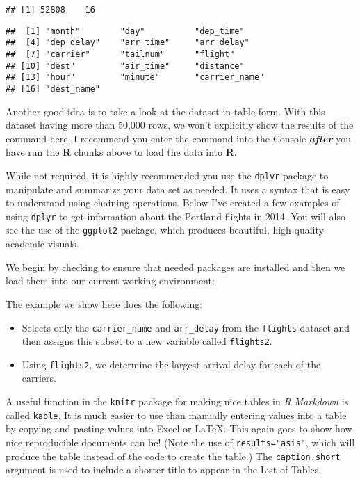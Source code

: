 \documentclass[print]{nuthesis}
\begin{document}
\begin{verbatim}
## [1] 52808    16
\end{verbatim}

\begin{verbatim}
##  [1] "month"        "day"          "dep_time"    
##  [4] "dep_delay"    "arr_time"     "arr_delay"   
##  [7] "carrier"      "tailnum"      "flight"      
## [10] "dest"         "air_time"     "distance"    
## [13] "hour"         "minute"       "carrier_name"
## [16] "dest_name"
\end{verbatim}

Another good idea is to take a look at the dataset in table form. With this dataset having more than 50,000 rows, we won't explicitly show the results of the command here. I recommend you enter the command into the Console \textbf{\emph{after}} you have run the \textbf{R} chunks above to load the data into \textbf{R}.

While not required, it is highly recommended you use the \texttt{dplyr} package to manipulate and summarize your data set as needed. It uses a syntax that is easy to understand using chaining operations. Below I've created a few examples of using \texttt{dplyr} to get information about the Portland flights in 2014. You will also see the use of the \texttt{ggplot2} package, which produces beautiful, high-quality academic visuals.

We begin by checking to ensure that needed packages are installed and then we load them into our current working environment:

\clearpage

The example we show here does the following:

\begin{itemize}
\item
  Selects only the \texttt{carrier\_name} and \texttt{arr\_delay} from the \texttt{flights} dataset and then assigns this subset to a new variable called \texttt{flights2}.
\item
  Using \texttt{flights2}, we determine the largest arrival delay for each of the carriers.
\end{itemize}

A useful function in the \texttt{knitr} package for making nice tables in \emph{R Markdown} is called \texttt{kable}. It is much easier to use than manually entering values into a table by copying and pasting values into Excel or LaTeX. This again goes to show how nice reproducible documents can be! (Note the use of \texttt{results="asis"}, which will produce the table instead of the code to create the table.) The \texttt{caption.short} argument is used to include a shorter title to appear in the List of Tables.
\end{document}

